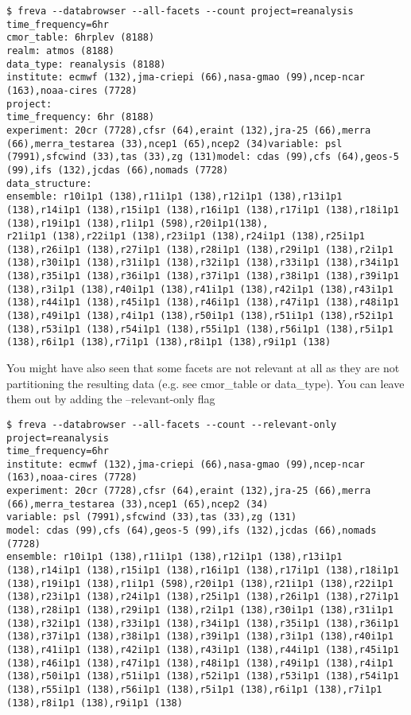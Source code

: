 \documentclass[a4paper,11pt]{ltxdoc}
\begin{document}
\begin{lstlisting}
$ freva --databrowser --all-facets --count project=reanalysis time_frequency=6hr
cmor_table: 6hrplev (8188)
realm: atmos (8188)
data_type: reanalysis (8188)
institute: ecmwf (132),jma-criepi (66),nasa-gmao (99),ncep-ncar (163),noaa-cires (7728)
project: 
time_frequency: 6hr (8188)
experiment: 20cr (7728),cfsr (64),eraint (132),jra-25 (66),merra (66),merra_testarea (33),ncep1 (65),ncep2 (34)variable: psl (7991),sfcwind (33),tas (33),zg (131)model: cdas (99),cfs (64),geos-5 (99),ifs (132),jcdas (66),nomads (7728)
data_structure: 
ensemble: r10i1p1 (138),r11i1p1 (138),r12i1p1 (138),r13i1p1 (138),r14i1p1 (138),r15i1p1 (138),r16i1p1 (138),r17i1p1 (138),r18i1p1 (138),r19i1p1 (138),r1i1p1 (598),r20i1p1(138),
r21i1p1 (138),r22i1p1 (138),r23i1p1 (138),r24i1p1 (138),r25i1p1 (138),r26i1p1 (138),r27i1p1 (138),r28i1p1 (138),r29i1p1 (138),r2i1p1 (138),r30i1p1 (138),r31i1p1 (138),r32i1p1 (138),r33i1p1 (138),r34i1p1 (138),r35i1p1 (138),r36i1p1 (138),r37i1p1 (138),r38i1p1 (138),r39i1p1 (138),r3i1p1 (138),r40i1p1 (138),r41i1p1 (138),r42i1p1 (138),r43i1p1 (138),r44i1p1 (138),r45i1p1 (138),r46i1p1 (138),r47i1p1 (138),r48i1p1 (138),r49i1p1 (138),r4i1p1 (138),r50i1p1 (138),r51i1p1 (138),r52i1p1 (138),r53i1p1 (138),r54i1p1 (138),r55i1p1 (138),r56i1p1 (138),r5i1p1 (138),r6i1p1 (138),r7i1p1 (138),r8i1p1 (138),r9i1p1 (138)
\end{lstlisting}
You might have also seen that some facets are not relevant at all as they are not partitioning the resulting data (e.g. see cmor\_table or data\_type). You can leave them out by adding the --relevant-only flag
\begin{lstlisting}
$ freva --databrowser --all-facets --count --relevant-only project=reanalysis 
time_frequency=6hr
institute: ecmwf (132),jma-criepi (66),nasa-gmao (99),ncep-ncar (163),noaa-cires (7728)
experiment: 20cr (7728),cfsr (64),eraint (132),jra-25 (66),merra (66),merra_testarea (33),ncep1 (65),ncep2 (34)
variable: psl (7991),sfcwind (33),tas (33),zg (131)
model: cdas (99),cfs (64),geos-5 (99),ifs (132),jcdas (66),nomads (7728)
ensemble: r10i1p1 (138),r11i1p1 (138),r12i1p1 (138),r13i1p1 (138),r14i1p1 (138),r15i1p1 (138),r16i1p1 (138),r17i1p1 (138),r18i1p1 (138),r19i1p1 (138),r1i1p1 (598),r20i1p1 (138),r21i1p1 (138),r22i1p1 (138),r23i1p1 (138),r24i1p1 (138),r25i1p1 (138),r26i1p1 (138),r27i1p1 (138),r28i1p1 (138),r29i1p1 (138),r2i1p1 (138),r30i1p1 (138),r31i1p1 (138),r32i1p1 (138),r33i1p1 (138),r34i1p1 (138),r35i1p1 (138),r36i1p1 (138),r37i1p1 (138),r38i1p1 (138),r39i1p1 (138),r3i1p1 (138),r40i1p1 (138),r41i1p1 (138),r42i1p1 (138),r43i1p1 (138),r44i1p1 (138),r45i1p1 (138),r46i1p1 (138),r47i1p1 (138),r48i1p1 (138),r49i1p1 (138),r4i1p1 (138),r50i1p1 (138),r51i1p1 (138),r52i1p1 (138),r53i1p1 (138),r54i1p1 (138),r55i1p1 (138),r56i1p1 (138),r5i1p1 (138),r6i1p1 (138),r7i1p1 (138),r8i1p1 (138),r9i1p1 (138)
\end{lstlisting}
\end{document}
